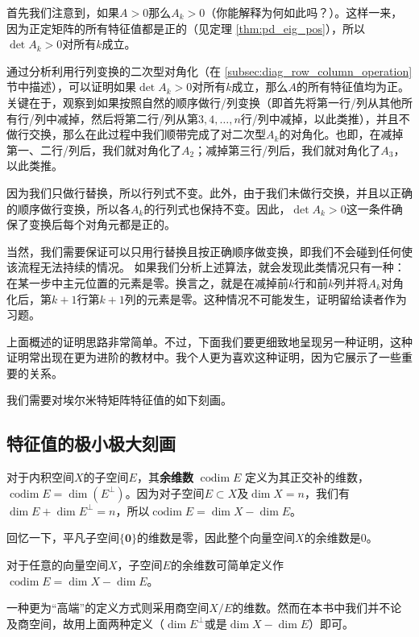 首先我们注意到，如果$A>0$那么$A_k>0$（你能解释为何如此吗？）。这样一来，因为正定矩阵的所有特征值都是正的（见定理 \ref{thm:pd_eig_pos}），所以$\det A_k>0$对所有$k$成立。

通过分析利用行列变换的二次型对角化（在 \ref{subsec:diag_row_column_operation} 节中描述），可以证明如果$\det A_k>0$对所有$k$成立，那么$A$的所有特征值均为正。关键在于，观察到如果按照自然的顺序做行/列变换（即首先将第一行/列从其他所有行/列中减掉，然后将第二行/列从第$3,4,\dots,n$行/列中减掉，以此类推），并且不做行交换，那么在此过程中我们顺带完成了对二次型$A_k$的对角化。也即，在减掉第一、二行/列后，我们就对角化了$A_2$；减掉第三行/列后，我们就对角化了$A_3$，以此类推。

因为我们只做行替换，所以行列式不变。此外，由于我们未做行交换，并且以正确的顺序做行变换，所以各$A_k$的行列式也保持不变。因此，$\det A_k>0$这一条件确保了变换后每个对角元都是正的。

当然，我们需要保证可以只用行替换且按正确顺序做变换，即我们不会碰到任何使该流程无法持续的情况。
如果我们分析上述算法，就会发现此类情况只有一种：在某一步中主元位置的元素是零。换言之，就是在减掉前$k$行和前$k$列并将$A_k$对角化后，第$k+1$行第$k+1$列的元素是零。这种情况不可能发生，证明留给读者作为习题。{\hfill \qedsymbol}

上面概述的证明思路非常简单。不过，下面我们要更细致地呈现另一种证明，这种证明常出现在更为进阶的教材中。我个人更为喜欢这种证明，因为它展示了一些重要的关系。

我们需要对埃尔米特矩阵特征值的如下刻画。

\subsection{特征值的极小极大刻画}

对于内积空间$X$的子空间$E$，其{\bf 余维数} $\operatorname{codim}E$ 定义为其正交补的维数，$\operatorname{codim}E = \dim(E^\perp)$。因为对子空间$E\subset X$及$\dim X=n$，我们有$\dim E+\dim E^\perp=n$，所以$\operatorname{codim}E = \dim X-\dim E$。

回忆一下，平凡子空间$\{\mathbf{0}\}$的维数是零，因此整个向量空间$X$的余维数是$0$。

\begin{remark*}
  对于任意的向量空间$X$，子空间$E$的余维数可简单定义作$\operatorname{codim}E = \dim X-\dim E$。

  一种更为“高端”的定义方式则采用商空间$X/E$的维数。然而在本书中我们并不论及商空间，故用上面两种定义（$\dim E^\perp$或是$\dim X-\dim E$）即可。
\end{remark*}

